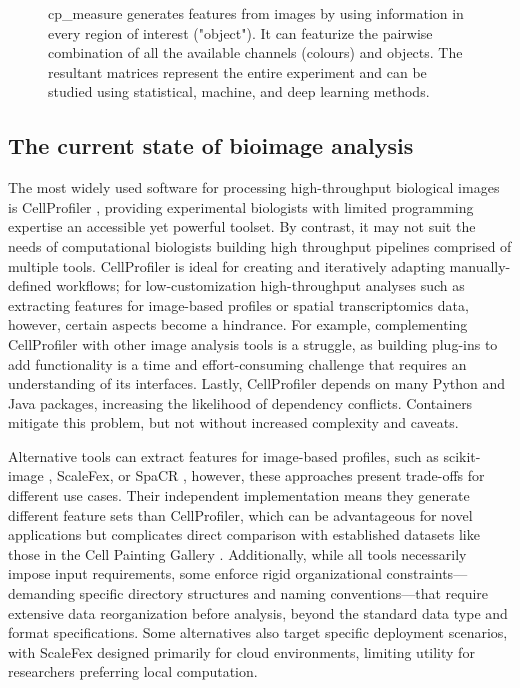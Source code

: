 \documentclass{article}
\begin{document}
\begin{figure}[htbp]
\centering

\caption{\label{fig:overview}cp\_measure generates features from images by using information in every region of interest ("object"). It can featurize the pairwise combination of all the available channels (colours) and objects. The resultant matrices represent the entire experiment and can be studied using statistical, machine, and deep learning methods.}
\end{figure}

\subsection{The current state of bioimage analysis}
\label{sec:org8f5b33d}
The most widely used software for processing high-throughput biological images is CellProfiler \citep{stirlingCellProfiler4Improvements2021}, providing experimental biologists with limited programming expertise an accessible yet powerful toolset. By contrast, it may not suit the needs of computational biologists building high throughput pipelines comprised of multiple tools. CellProfiler is ideal for creating and iteratively adapting manually-defined workflows; for low-customization high-throughput analyses such as extracting features for image-based profiles or spatial transcriptomics data, however, certain aspects become a hindrance. For example, complementing CellProfiler with other image analysis tools is a struggle, as building plug-ins to add functionality is a time and effort-consuming challenge that requires an understanding of its interfaces. Lastly, CellProfiler depends on many Python and Java packages, increasing the likelihood of dependency conflicts. Containers mitigate this problem, but not without increased complexity and caveats.

Alternative tools can extract features for image-based profiles, such as scikit-image \citep{waltScikitimageImageProcessing2014}, ScaleFex, or SpaCR \citep{comoletHighlyEfficientScalable2024,einarolafssonSpaCr2025}, however, these approaches present trade-offs for different use cases. Their independent implementation means they generate different feature sets than CellProfiler, which can be advantageous for novel
 applications but complicates direct comparison with established datasets like those in the Cell Painting Gallery \cite{weisbartCellPaintingGallery2024}. 
Additionally, while all tools necessarily impose input requirements, some enforce rigid organizational constraints—demanding specific directory structures and naming conventions—that require extensive data reorganization before analysis, beyond the standard data type and format specifications.
Some alternatives also target specific deployment scenarios, with ScaleFex designed primarily for cloud environments, limiting utility for researchers preferring local computation.
\end{document}
